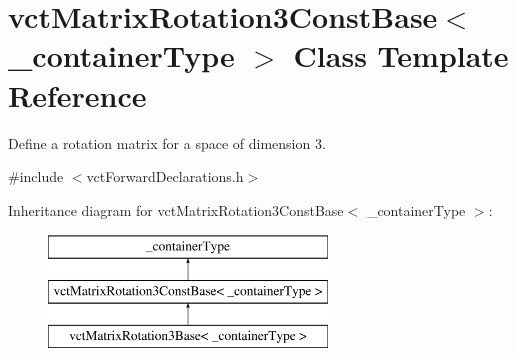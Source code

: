 \hypertarget{classvct_matrix_rotation3_const_base}{\section{vct\-Matrix\-Rotation3\-Const\-Base$<$ \-\_\-container\-Type $>$ Class Template Reference}
\label{classvct_matrix_rotation3_const_base}
}


Define a rotation matrix for a space of dimension 3.  




{\ttfamily \#include $<$vct\-Forward\-Declarations.\-h$>$}

Inheritance diagram for vct\-Matrix\-Rotation3\-Const\-Base$<$ \-\_\-container\-Type $>$\-:\begin{figure}[H]
\begin{center}
\leavevmode
\includegraphics[height=3.000000cm]{dd/d34/classvct_matrix_rotation3_const_base}
\end{center}
\end{figure}
